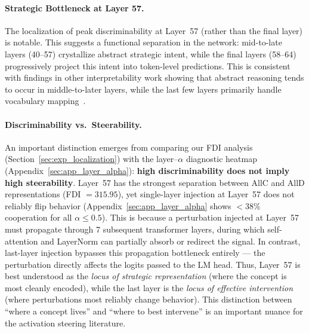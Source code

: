 \documentclass{article}
\begin{document}
\paragraph{Strategic Bottleneck at Layer 57.}
The localization of peak discriminability at Layer~57 (rather than the final layer) is notable. This suggests a functional separation in the network: mid-to-late layers (40--57) crystallize abstract strategic intent, while the final layers (58--64) progressively project this intent into token-level predictions. This is consistent with findings in other interpretability work showing that abstract reasoning tends to occur in middle-to-later layers, while the last few layers primarily handle vocabulary mapping~\citep{olah2020zoom}.

\paragraph{Discriminability vs.\ Steerability.}
An important distinction emerges from comparing our FDI analysis (Section~\ref{sec:exp_localization}) with the layer--$\alpha$ diagnostic heatmap (Appendix~\ref{sec:app_layer_alpha}): \textbf{high discriminability does not imply high steerability}. Layer~57 has the strongest separation between AllC and AllD representations (FDI $= 315.95$), yet single-layer injection at Layer~57 does not reliably flip behavior (Appendix~\ref{sec:app_layer_alpha} shows $< 38\%$ cooperation for all $\alpha \leq 0.5$). This is because a perturbation injected at Layer~57 must propagate through 7 subsequent transformer layers, during which self-attention and LayerNorm can partially absorb or redirect the signal. In contrast, last-layer injection bypasses this propagation bottleneck entirely --- the perturbation directly affects the logits passed to the LM head. Thus, Layer~57 is best understood as the \textit{locus of strategic representation} (where the concept is most cleanly encoded), while the last layer is the \textit{locus of effective intervention} (where perturbations most reliably change behavior). This distinction between ``where a concept lives'' and ``where to best intervene'' is an important nuance for the activation steering literature.
\end{document}
